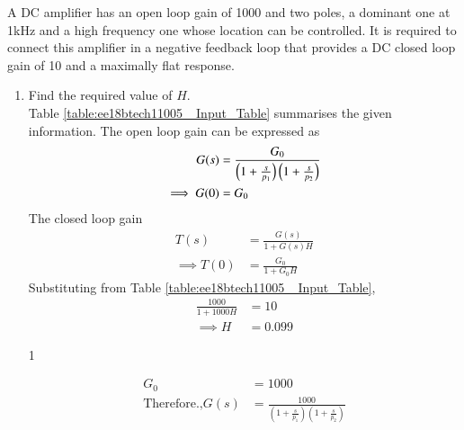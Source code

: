 A DC amplifier has an open loop gain of 1000 and two poles, a dominant one at 1kHz and a high frequency one whose location can be controlled. It is required to connect this amplifier in a negative feedback loop that provides a DC closed loop gain of 10 and a maximally flat response. 

\begin{enumerate}[label=\arabic*.,ref=\theenumi]

\item Find the required value of $H$.
\\
\solution Table \ref{table:ee18btech11005_ Input_Table} summarises the given information.  The open loop gain can be expressed as
\begin{align}
\label{eq:ee18btech11005_open_loop_gain} 
  G(s) &= \frac{G_0}{\left(1+\frac{s}{p_{1}}\right)\left(1+\frac{s}{p_{2}}\right)} 
\\
\implies G(0) &= G_0
\end{align}
The closed loop gain 
\begin{align}
 \label{eq:ee18btech11005_transfer_function}
    T(s) &= \frac{G(s)}{1+G(s)H}
\\
\implies T(0) &= \frac{G_0}{1+G_0H}
\end{align}
%
Substituting from Table \ref{table:ee18btech11005_ Input_Table}, 
\begin{align}
\frac{1000}{1+1000H} &= 10
\\
\implies H &=  0.099 
\label{eq:ee18btech11005_h_value}
\end{align}
%
\begin{table}[!ht]
\centering

\caption{1}
\label{table:ee18btech11005_ Input_Table}
\end{table}
\begin{align}
    G_0 &= 1000\\
\text{Therefore.,} G(s)&= \frac{1000}{(1+\frac{s}{p_{1}})(1+\frac{s}{p_{2}})}  
\end{align}

\end{enumerate}

